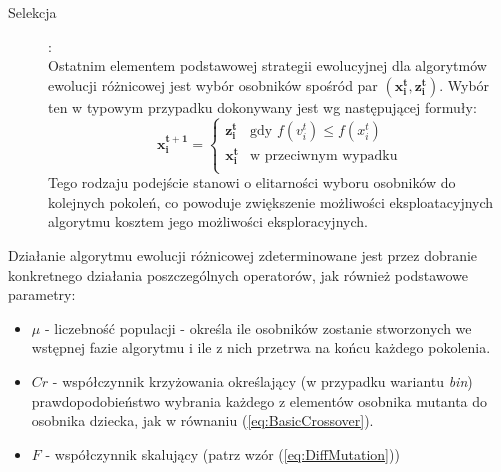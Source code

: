 \documentclass[12pt,a4paper]{report}
\begin{document}
{{{\begin{description}
		\item[Selekcja]:\\
Ostatnim elementem podstawowej strategii ewolucyjnej dla algorytmów ewolucji różnicowej jest wybór osobników spośród par $(\mathbf{x_i^{t}}, \mathbf{z_i^{t}})$. Wybór ten w typowym przypadku dokonywany jest wg następującej formuły:
\begin{equation}
\mathbf{x_{i}^{t+1}} = \left\{ \begin{array}{ll}
\mathbf{z_{i}^{t}} & \textrm{gdy $f(v_i^t) \le f(x_i^t)$}\\
\mathbf{x_{i}^{t}} & \textrm{w przeciwnym wypadku}\\
\end{array} \right.
\end{equation}
Tego rodzaju podejście stanowi o elitarności wyboru osobników do kolejnych pokoleń, co powoduje zwiększenie możliwości eksploatacyjnych algorytmu kosztem jego możliwości eksploracyjnych.
\end{description}
}

\par{
Działanie algorytmu ewolucji różnicowej zdeterminowane jest przez dobranie konkretnego działania poszczególnych operatorów, jak również podstawowe parametry:
\begin{itemize}
\item $\mu$ - liczebność populacji - określa ile osobników zostanie stworzonych we wstępnej fazie algorytmu i ile z nich przetrwa na końcu każdego pokolenia.
\item $Cr$ - współczynnik krzyżowania określający (w przypadku wariantu \emph{bin}) prawdopodobieństwo wybrania każdego z elementów osobnika mutanta do osobnika dziecka, jak w równaniu (\ref{eq:BasicCrossover}).
\item $F$ - współczynnik skalujący (patrz wzór (\ref{eq:DiffMutation}))
\end{itemize}
}

}}
\end{document}
